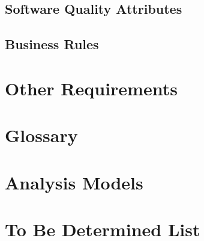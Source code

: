 \section{Software Quality Attributes}
\section{Business Rules}

\chapter{Other Requirements}
\label{Other Requirements}

\begin{appendices}
\chapter{Glossary}
\chapter{Analysis Models}
\chapter{To Be Determined List}


\end{appendices}


